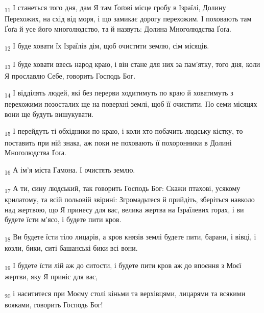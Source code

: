 \begin{tcolorbox}
\textsubscript{11} І станеться того дня, дам Я там Ґоґові місце гробу в Ізраїлі, Долину Перехожих, на схід від моря, і що замикає дорогу перехожим. І поховають там Ґоґа й усе його многолюдство, та й назвуть: Долина Многолюдства Ґоґа.
\end{tcolorbox}
\begin{tcolorbox}
\textsubscript{12} І буде ховати їх Ізраїлів дім, щоб очистити землю, сім місяців.
\end{tcolorbox}
\begin{tcolorbox}
\textsubscript{13} І буде ховати ввесь народ краю, і він стане для них за пам'ятку, того дня, коли Я прославлю Себе, говорить Господь Бог.
\end{tcolorbox}
\begin{tcolorbox}
\textsubscript{14} І відділять людей, які без перерви ходитимуть по краю й ховатимуть з перехожими позосталих ще на поверхні землі, щоб її очистити. По семи місяцях вони ще будуть вишукувати.
\end{tcolorbox}
\begin{tcolorbox}
\textsubscript{15} І перейдуть ті обхідники по краю, і коли хто побачить людську кістку, то поставить при ній знака, аж поки не поховають її похоронники в Долині Многолюдства Ґоґа.
\end{tcolorbox}
\begin{tcolorbox}
\textsubscript{16} А ім'я міста Гамона. І очистять землю.
\end{tcolorbox}
\begin{tcolorbox}
\textsubscript{17} А ти, сину людський, так говорить Господь Бог: Скажи птахові, усякому крилатому, та всій польовій звірині: Згромадьтеся й прийдіть, зберіться навколо над жертвою, що Я принесу для вас, велика жертва на Ізраїлевих горах, і ви будете їсти м'ясо, і будете пити кров.
\end{tcolorbox}
\begin{tcolorbox}
\textsubscript{18} Ви будете їсти тіло лицарів, а кров князів землі будете пити, барани, і вівці, і козли, бики, ситі башанські бики всі вони.
\end{tcolorbox}
\begin{tcolorbox}
\textsubscript{19} І будете їсти лій аж до ситости, і будете пити кров аж до впоєння з Моєї жертви, яку Я приніс для вас,
\end{tcolorbox}
\begin{tcolorbox}
\textsubscript{20} і насититеся при Моєму столі кіньми та верхівцями, лицарями та всякими вояками, говорить Господь Бог!
\end{tcolorbox}
